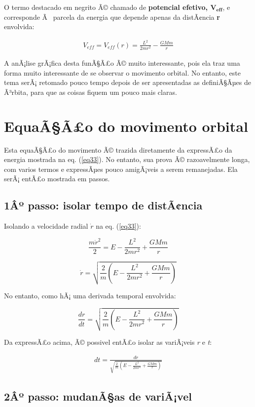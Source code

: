 O termo destacado em negrito Ã© chamado de \textbf{potencial efetivo, $\mathbf{V_{eff}}$}, e corresponde Ã  parcela da energia que depende apenas da distÃ¢ncia \textbf{r} envolvida:

\begin{eqnarray}
    V_{eff} = V_{eff}(r)  = \frac{L^2}{2mr^2} - \frac{GMm}{r} \label{eq34}
\end{eqnarray}

A anÃ¡lise grÃ¡fica desta funÃ§Ã£o Ã© muito interessante, pois ela traz uma forma muito interessante de se observar o movimento orbital. No entanto, este tema serÃ¡ retomado pouco tempo depois de ser apresentadas as definiÃ§Ãµes de Ã³rbita, para que as coisas fiquem um pouco mais claras.

\section{EquaÃ§Ã£o do movimento orbital}

Esta equaÃ§Ã£o do movimento Ã© trazida diretamente da expressÃ£o da energia mostrada na eq. (\ref{eq33}). No entanto, sua prova Ã© razoavelmente longa, com varios termos e expressÃµes pouco amigÃ¡veis a serem remanejadas. Ela serÃ¡ entÃ£o mostrada em passos.

\subsection{1Âº passo: isolar tempo de distÃ¢ncia}

Isolando a velocidade radial $\dot{r}$ na eq. (\ref{eq33}):

\[
	\frac{m\dot{r}^2}{2} = E - \frac{L^2}{2mr^2} + \frac{GMm}{r}
\]

\[
	 \dot{r} = \sqrt{\frac{2}{m}\left(E - \frac{L^2}{2mr^2} + \frac{GMm}{r}\right)}
\]

No entanto, como hÃ¡ uma derivada temporal envolvida:

\[
	\frac{dr}{dt} = \sqrt{\frac{2}{m}\left(E - \frac{L^2}{2mr^2} + \frac{GMm}{r}\right)}
\]

Da expressÃ£o acima, Ã© possivel entÃ£o isolar as variÃ¡veis \textit{r} e \textit{t}:

\begin{eqnarray}
	dt = \frac{dr}{\sqrt{\frac{2}{m}\left(E - \frac{L^2}{2mr^2} + \frac{GMm}{r}\right)}} \label{eq35}
\end{eqnarray}

\subsection{2Âº passo: mudanÃ§as de variÃ¡vel}

